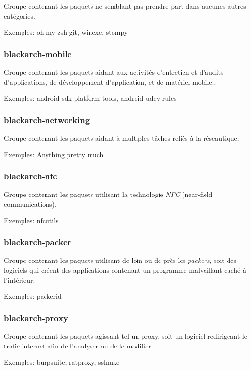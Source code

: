 \documentclass[a4paper, oneside, 11pt]{book}
\begin{document}
Groupe contenant les paquets ne semblant pas prendre part dans aucunes autres
catégories.

Exemples: oh-my-zsh-git, winexe, stompy

\subsubsection{blackarch-mobile}

Groupe contenant les paquets aidant aux activités d'entretien et d'audits
d'applications, de développement d'application, et de matériel mobile..

Exemples: android-sdk-platform-tools, android-udev-rules

\subsubsection{blackarch-networking}

Groupe contenant les paquets aidant à multiples tâches reliés à la réseautique.

Exemples: Anything pretty much

\subsubsection{blackarch-nfc}

Groupe contenant les paquets utilisant la technologie \textit{NFC} (near-field
communications).

Exemples: nfcutils

\subsubsection{blackarch-packer}

Groupe contenant les paquets utilisant de loin ou de près les \textit{packers},
soit des logiciels qui créent des applications contenant un programme
malveillant caché à l'intérieur.

Exemples: packerid

\subsubsection{blackarch-proxy}

Groupe contenant les paquets agissant tel un proxy, soit un logiciel redirigeant
le trafic internet afin de l'analyser ou de le modifier.

Exemples: burpsuite, ratproxy, sslnuke
\end{document}
